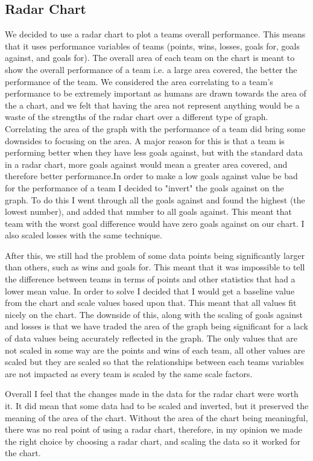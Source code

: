 \documentclass[10pt, journal]{IEEEtran}
\begin{document}
\subsection{Radar Chart}
We decided to use a radar chart to plot a teams overall performance. This means that it uses performance variables of teams (points, wins, losses, goals for, goals against, and goals for). The overall area of each team on the chart is meant to show the overall performance of a team i.e. a large area covered, the better the performance of the team. We considered the area correlating to a team's performance to be extremely important as humans are drawn towards the area of the a chart, and we felt that having the area not represent anything would be a waste of the strengths of the radar chart over a different type of graph. Correlating the area of the graph with the performance of a team did bring some downsides to focusing on the area. A major reason for this is that a team is performing better when they have less goals against, but with the standard data in a radar chart, more goals against would mean a greater area covered, and therefore better performance.In order to make a low goals against value be bad for the performance of a team I decided to "invert" the goals against on the graph. To do this I went through all the goals against and found the highest (the lowest number), and added that number to all goals against. This meant that team with the worst goal difference would have zero goals against on our chart. I also scaled losses with the same technique.

After this, we still had the problem of some data points being significantly larger than others, such as wins and goals for. This meant that it was impossible to tell the difference between teams in terms of points and other statistics that had a lower mean value. In order to solve I decided that I would get a baseline value from the chart and scale values based upon that. This meant that all values fit nicely on the chart. The downside of this, along with the scaling of goals against and losses is that we have traded the area of the graph being significant for a lack of data values being accurately reflected in the graph. The only values that are not scaled in some way are the points and wins of each team, all other values are scaled but they are scaled so that the relationships between each teams variables are not impacted as every team is scaled by the same scale factors.

Overall I feel that the changes made in the data for the radar chart were worth it. It did mean that some data had to be scaled and inverted, but it preserved the meaning of the area of the chart. Without the area of the chart being meaningful, there was no real point of using a radar chart, therefore, in my opinion we made the right choice by choosing a radar chart, and scaling the data so it worked for the chart.
\end{document}
